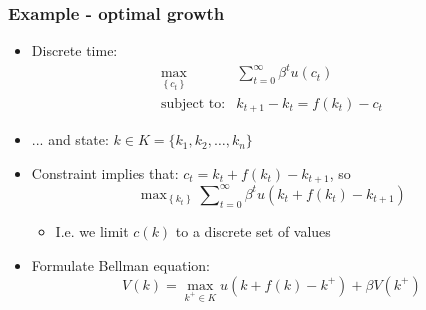 \documentclass[bigger,handout]{beamer}
\newenvironment{stepitemize}{\begin{itemize}[<+->]}{\end{itemize} }
\begin{document}
\begin{frame}%

\frametitle{Example - optimal growth}

\begin{stepitemize}
\item Discrete time:
\begin{equation*}
\begin{array}{rc}
\max_{\left\{ c_{t}\right\} } & \sum_{t=0}^{\infty }\beta ^{t}u\left(
c_{t}\right) \\
\text{subject to:} & k_{t+1}-k_{t}=f\left( k_{t}\right) -c_{t}%
\end{array}%
\end{equation*}

\item ... and state: $k\in K=\{k_{1},k_{2},\ldots ,k_{n}\}$

\item Constraint implies that: $c_{t}=k_{t}+f\left( k_{t}\right) -k_{t+1}$,
so%
\begin{equation*}
\max\nolimits_{\left\{ k_{t}\right\} }\sum\nolimits_{t=0}^{\infty }\beta
^{t}u\left( k_{t}+f\left( k_{t}\right) -k_{t+1}\right)
\end{equation*}

\begin{stepitemize}
\item I.e. we limit $c\left( k\right) $ to a discrete set of values
\end{stepitemize}

\item Formulate Bellman equation:%
\begin{equation*}
V(k)=\max_{k^{+}\in K}u(k+f(k)-k^{+})+\beta V(k^{+})
\end{equation*}
\end{stepitemize}



\end{frame}%
\end{document}
